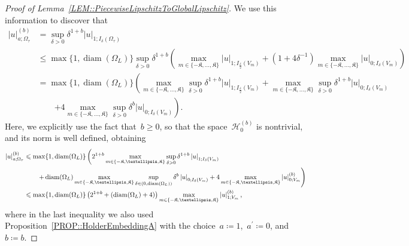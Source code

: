 \documentclass[10pt,a4paper]{amsart}
\makeatletter
\newcommand{\abs}[1]{\left\lvert#1\right\rvert}
\newcommand{\constapp}[1]{%
  \csname constapp@#1\endcsname%
}
\renewcommand{\geq}{\geqslant}
\renewcommand{\leq}{\leqslant}
\makeatother
\begin{document}
\begin{proof}[Proof of Lemma~\ref{LEM::PiecewiseLipschitzToGlobalLipschitz}]
    We use this information to discover that
    \begin{equation}\label{EQ::LongComputationBis}
        \begin{split}
            \abs{u}_{a; \Omega_\tau}^{(b)} &= \sup_{\delta > 0}\delta^{1+b} \abs{u}_{1; I_\delta(\Omega_\tau)}\\
                &\leq \max\{1,\operatorname{diam}(\Omega_L)\} \sup_{\delta > 0}\delta^{1+b}\left(\max_{m \in \{-\mathfrak{K},\dots,\mathfrak{K}\}} \abs{u}_{1; I_{\frac{\delta}{2}}(V_m)} + (1+4{\delta^{-1}})\max_{m \in \{-\mathfrak{K},\dots,\mathfrak{K}\}}\abs{u}_{0;I_\delta(V_m)}\right)\\
                &= \max\{1,\operatorname{diam}(\Omega_L)\} \left(\max_{m \in \{-\mathfrak{K},\dots,\mathfrak{K}\}}\sup_{\delta > 0}\delta^{1+b}\abs{u}_{1; I_{\frac{\delta}{2}}(V_m)} +\max_{m \in \{-\mathfrak{K},\dots,\mathfrak{K}\}} \sup_{\delta > 0}\delta^{1+b}\abs{u}_{0;I_\delta(V_m)}\right.\\
                &\qquad \left.+ 4\max_{m \in \{-\mathfrak{K},\dots,\mathfrak{K}\}} \sup_{\delta > 0}\delta^{b}\abs{u}_{0;I_\delta(V_m)}\right).
        \end{split}
    \end{equation}
    Here, we explicitly use the fact that~$b \geq 0$, so that the space~$\mathcal{H}_0^{(b)}$ is nontrivial, and its norm is well defined, obtaining
    \begin{equation}\label{EQ::PiecewiseRegularityToGlobalLongComputationLipschitz}
        \begin{split}
                \abs{u}_{a; \Omega_\tau}^{(b)}&\leq \max\{1,\operatorname{diam}(\Omega_L)\} \left(2^{1+b}\max_{m \in \{-\mathfrak{K},\dots,\mathfrak{K}\}}\sup_{\delta > 0}\delta^{1+b}\abs{u}_{1; I_\delta(V_m)}\right.\\
                &\qquad \left.+ \operatorname{diam}(\Omega_L)\max_{m \in \{-\mathfrak{K},\dots,\mathfrak{K}\}} \sup_{\delta \in (0,\operatorname{diam}(\Omega_L))}\delta^{b}\abs{u}_{0;I_\delta(V_m)}+4\max_{m \in \{-\mathfrak{K},\dots,\mathfrak{K}\}} \abs{u}_{0;V_m}^{(b)}\right)\\
                &\leq \max\{1,\operatorname{diam}(\Omega_L)\} \left(2^{1+b} + \constapp{CONST::HolderEmbeddingA}\left(\operatorname{diam}(\Omega_L) + 4\right)\right)\max_{m \in \{-\mathfrak{K},\dots,\mathfrak{K}\}} \abs{u}_{1;V_m}^{(b)},
        \end{split}
    \end{equation}
    where in the last inequality we also used Proposition~\ref{PROP::HolderEmbeddingA} with the choice~$a \coloneq 1$,~$a^\prime \coloneq 0$, and~$b \coloneq b$.


\end{proof}
\end{document}
